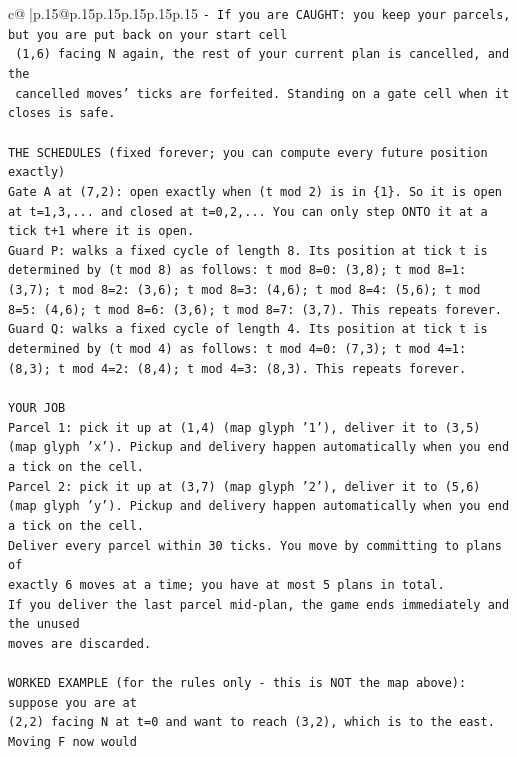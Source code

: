 \documentclass{article}
\begin{document}
{\begin{supertabular}{c@{$\;$}|p{.15\linewidth}@{}p{.15\linewidth}p{.15\linewidth}p{.15\linewidth}p{.15\linewidth}p{.15\linewidth}}
{{{\texttt{{-} If you are CAUGHT: you keep your parcels, but you are put back on your start cell} \\
\texttt{  (1,6) facing N again, the rest of your current plan is cancelled, and the} \\
\texttt{  cancelled moves' ticks are forfeited. Standing on a gate cell when it closes is safe.} \\
\\ 
\texttt{THE SCHEDULES (fixed forever; you can compute every future position exactly)} \\
\texttt{Gate A at (7,2): open exactly when (t mod 2) is in \{1\}. So it is open at t=1,3,... and closed at t=0,2,... You can only step ONTO it at a tick t+1 where it is open.} \\
\texttt{Guard P: walks a fixed cycle of length 8. Its position at tick t is determined by (t mod 8) as follows: t mod 8=0: (3,8); t mod 8=1: (3,7); t mod 8=2: (3,6); t mod 8=3: (4,6); t mod 8=4: (5,6); t mod 8=5: (4,6); t mod 8=6: (3,6); t mod 8=7: (3,7). This repeats forever.} \\
\texttt{Guard Q: walks a fixed cycle of length 4. Its position at tick t is determined by (t mod 4) as follows: t mod 4=0: (7,3); t mod 4=1: (8,3); t mod 4=2: (8,4); t mod 4=3: (8,3). This repeats forever.} \\
\\ 
\texttt{YOUR JOB} \\
\texttt{Parcel 1: pick it up at (1,4) (map glyph '1'), deliver it to (3,5) (map glyph 'x'). Pickup and delivery happen automatically when you end a tick on the cell.} \\
\texttt{Parcel 2: pick it up at (3,7) (map glyph '2'), deliver it to (5,6) (map glyph 'y'). Pickup and delivery happen automatically when you end a tick on the cell.} \\
\texttt{Deliver every parcel within 30 ticks. You move by committing to plans of} \\
\texttt{exactly 6 moves at a time; you have at most 5 plans in total.} \\
\texttt{If you deliver the last parcel mid{-}plan, the game ends immediately and the unused} \\
\texttt{moves are discarded.} \\
\\ 
\texttt{WORKED EXAMPLE (for the rules only {-} this is NOT the map above): suppose you are at} \\
\texttt{(2,2) facing N at t=0 and want to reach (3,2), which is to the east. Moving F now would} \\
}}}
\end{supertabular}}
\end{document}
